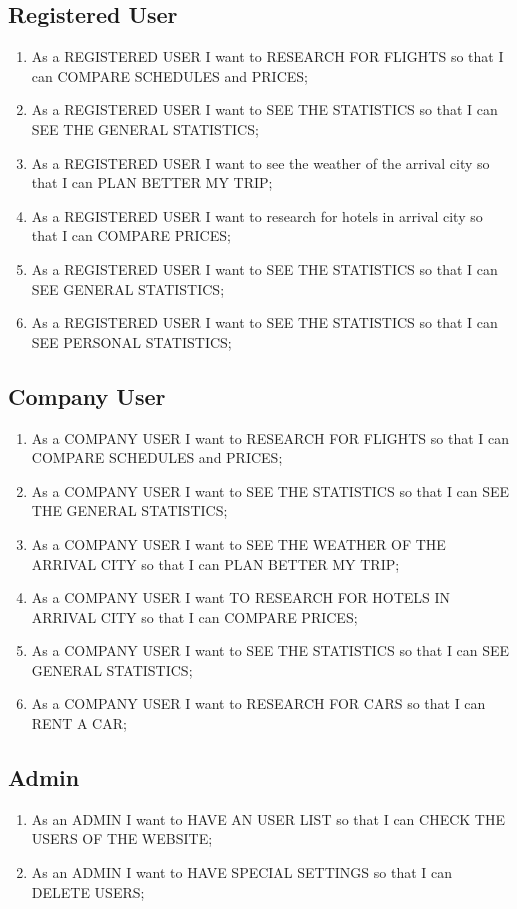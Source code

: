 \documentclass[11pt]{article}
\begin{document}
\subsection{Registered User}
\begin{enumerate}
	\item As a REGISTERED USER I want to RESEARCH FOR FLIGHTS so that I can COMPARE SCHEDULES and PRICES;
	\item As a REGISTERED USER I want to SEE THE STATISTICS so that I can SEE THE GENERAL STATISTICS;
	\item As a REGISTERED USER I want to see the weather of the arrival city so that I can PLAN BETTER MY TRIP;
	\item As a REGISTERED USER I want to research for hotels in arrival city so that I can COMPARE PRICES;
	\item As a REGISTERED USER I want to SEE THE STATISTICS so that I can SEE GENERAL STATISTICS;
	\item As a REGISTERED USER I want to SEE THE STATISTICS so that I can SEE PERSONAL STATISTICS;
\end{enumerate}

\subsection{Company User}
\begin{enumerate}
	\item As a COMPANY USER I want to RESEARCH FOR FLIGHTS so that I can COMPARE SCHEDULES and PRICES;
	\item As a COMPANY USER I want to SEE THE STATISTICS so that I can SEE THE GENERAL STATISTICS;
	\item As a COMPANY USER I want to SEE THE WEATHER OF THE ARRIVAL CITY so that I can PLAN BETTER MY TRIP;
	\item As a COMPANY USER I want TO RESEARCH FOR HOTELS IN ARRIVAL CITY so that I can COMPARE PRICES;
	\item As a COMPANY USER I want to SEE THE STATISTICS so that I can SEE GENERAL STATISTICS;
	\item As a COMPANY USER I want to RESEARCH FOR CARS so that I can RENT A CAR;
\end{enumerate}

\subsection{Admin}
\begin{enumerate}
	\item As an ADMIN I want to HAVE AN USER LIST so that I can CHECK THE USERS OF THE WEBSITE;
	\item As an ADMIN I want to HAVE SPECIAL SETTINGS so that I can DELETE USERS;
\end{enumerate}
\end{document}
